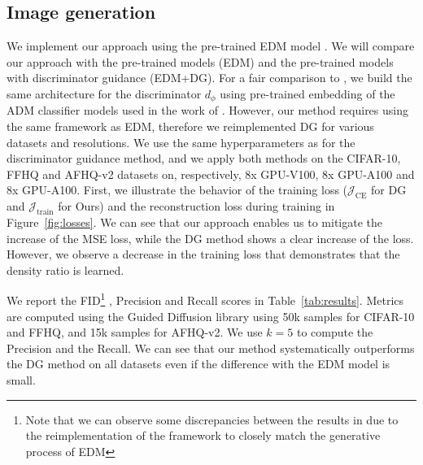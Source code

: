 \subsection{Image generation}
We implement our approach using the pre-trained EDM model \citep{karras}. We will compare our approach with the pre-trained models (EDM) and the pre-trained models with discriminator guidance (EDM+DG). For a fair comparison to \cite{kim2023refininggenerativeprocessdiscriminator}, we build the same architecture for the discriminator $d_\phi$ using pre-trained embedding of the ADM classifier models used in the work of \citet{dhariwal2021diffusionmodelsbeatgans}. However, our method requires using the same framework as EDM, therefore we reimplemented DG for various datasets and resolutions. We use the same hyperparameters as \citet{kim2023refininggenerativeprocessdiscriminator} for the discriminator guidance method, and we apply both methods on the CIFAR-10, FFHQ and AFHQ-v2 datasets on, respectively, 8x GPU-V100, 8x GPU-A100 and 8x GPU-A100. First, we illustrate the behavior of the training loss ($\mathcal{J}_{\mathrm{CE}}$ for DG and $\mathcal{J}_{\mathrm{train}}$ for Ours) and the reconstruction loss during training in Figure~\ref{fig:losses}. We can see that our approach enables us to mitigate the increase of the MSE loss, while the DG method shows a clear increase of the loss. However, we observe a decrease in the training loss that demonstrates that the density ratio is learned.

We report the FID\footnote{Note that we can observe some discrepancies between the results in \cite{kim2023refininggenerativeprocessdiscriminator} due to the reimplementation of the framework to closely match the generative process of EDM} \citep{heusel_gans_2017}, Precision and Recall \citep{kynkaanniemi_improved_2019} scores in Table~\ref{tab:results}. Metrics are computed using the Guided Diffusion library \citep{dhariwal2021diffusionmodelsbeatgans} using 50k samples for CIFAR-10 and FFHQ, and 15k samples for AFHQ-v2. We use $k=5$ to compute the Precision and the Recall. We can see that our method systematically outperforms the DG method on all datasets even if the difference with the EDM model is small.    

